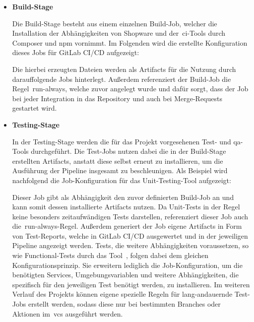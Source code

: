 \begin{itemize}
    \item {
        \textbf{Build-Stage}\par
        Die Build-Stage besteht aus einem einzelnen Build-Job, welcher die Installation der Abhängigkeiten
        von Shopware und der\ \acrshort{ci}-Tools durch Composer und \acrshort{npm} vornimmt.
        Im Folgenden wird die erstellte Konfiguration dieses Jobs für GitLab CI/CD aufgezeigt:

        \vspace{-2.3em}

        Die hierbei erzeugten Dateien werden als Artifacts für die Nutzung durch darauffolgende Jobs hinterlegt.
        Außerdem referenziert der Build-Job die Regel\ \glqq run-always\grqq, welche zuvor angelegt wurde und dafür
        sorgt, dass der Job bei jeder Integration in das Repository und auch bei Merge-Requests gestartet wird.
    }

    \item {
        \textbf{Testing-Stage}\par
        In der Testing-Stage werden die für das Projekt vorgesehenen Test- und \acrshort{qa}-Tools durchgeführt.
        Die Test-Jobs nutzen dabei die in der Build-Stage erstellten Artifacts, anstatt diese selbst erneut zu
        installieren, um die Ausführung der Pipeline insgesamt zu beschleunigen.
        Als Beispiel wird nachfolgend die Job-Konfiguration für das Unit-Testing-Tool  aufgezeigt:

        \vspace{-2.3em}

        Dieser Job gibt als Abhängigkeit den zuvor definierten Build-Job an und kann somit dessen installierte
        Artifacts nutzen.
        Da Unit-Tests in der Regel keine besonders zeitaufwändigen Tests darstellen, referenziert dieser Job auch
        die\ \glqq run-always\grqq-Regel.
        Außerdem generiert der Job eigene Artifacts in Form von Test-Reports, welche in GitLab CI/CD ausgewertet
        und in der jeweiligen Pipeline angezeigt werden.
        Tests, die weitere Abhängigkeiten voraussetzen, so wie Functional-Tests durch das Tool\ ,
        folgen dabei dem gleichen Konfigurationsprinzip.
        Sie erweitern lediglich die Job-Konfiguration, um die benötigten Services, Umgebungsvariablen und weitere
        Abhängigkeiten, die spezifisch für den jeweiligen Test benötigt werden, zu installieren.
        Im weiteren Verlauf des Projekts können eigene spezielle Regeln für lang-andauernde Test-Jobs erstellt
        werden, sodass diese nur bei bestimmten Branches oder Aktionen im\ \acrshort{vcs} ausgeführt werden.
    }


\end{itemize}
